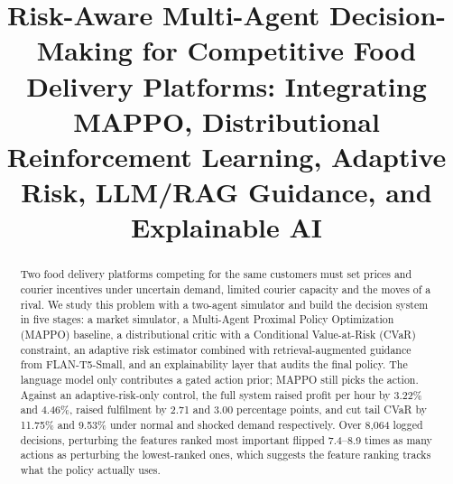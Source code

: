 \documentclass[conference]{IEEEtran}
\begin{document}
\title{Risk-Aware Multi-Agent Decision-Making for Competitive Food Delivery Platforms: Integrating MAPPO, Distributional Reinforcement Learning, Adaptive Risk, LLM/RAG Guidance, and Explainable AI}

\author{
\and
{}
\and
{}
\and
{}
\and
{}
}

\maketitle

\begin{abstract}
Two food delivery platforms competing for the same customers must set prices and courier incentives under uncertain demand, limited courier capacity and the moves of a rival. We study this problem with a two-agent simulator and build the decision system in five stages: a market simulator, a Multi-Agent Proximal Policy Optimization (MAPPO) baseline, a distributional critic with a Conditional Value-at-Risk (CVaR) constraint, an adaptive risk estimator combined with retrieval-augmented guidance from FLAN-T5-Small, and an explainability layer that audits the final policy. The language model only contributes a gated action prior; MAPPO still picks the action. Against an adaptive-risk-only control, the full system raised profit per hour by 3.22\% and 4.46\%, raised fulfilment by 2.71 and 3.00 percentage points, and cut tail CVaR by 11.75\% and 9.53\% under normal and shocked demand respectively. Over 8,064 logged decisions, perturbing the features ranked most important flipped 7.4--8.9 times as many actions as perturbing the lowest-ranked ones, which suggests the feature ranking tracks what the policy actually uses.
\end{abstract}
\end{document}

